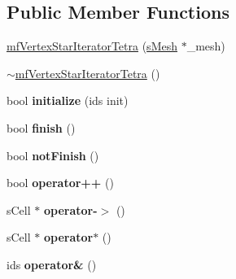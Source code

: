 \subsection*{Public Member Functions}
\begin{DoxyCompactItemize}
\item 
\hyperlink{classmf_1_1mfVertexStarIteratorTetra_a390fe108ee096669cb97b675463dc108}{mfVertexStarIteratorTetra} (\hyperlink{classmf_1_1mfIterator_aca31e4d7e7eca4e3b100530d8725064b}{sMesh} $\ast$\_\-mesh)
\item 
\hyperlink{classmf_1_1mfVertexStarIteratorTetra_aa1016d2262cde5e8fc20a884bd73b672}{$\sim$mfVertexStarIteratorTetra} ()
\item 
\hypertarget{classmf_1_1mfVertexStarIteratorTetra_a654c6ec5fb4b32cd5ae596d0f27e5e13}{
bool {\bfseries initialize} (ids init)}
\label{classmf_1_1mfVertexStarIteratorTetra_a654c6ec5fb4b32cd5ae596d0f27e5e13}

\item 
\hypertarget{classmf_1_1mfVertexStarIteratorTetra_a183585661d0ee1a496608d63d8730075}{
bool {\bfseries finish} ()}
\label{classmf_1_1mfVertexStarIteratorTetra_a183585661d0ee1a496608d63d8730075}

\item 
\hypertarget{classmf_1_1mfVertexStarIteratorTetra_a37f6714f32884ded48627013ef1fa5a4}{
bool {\bfseries notFinish} ()}
\label{classmf_1_1mfVertexStarIteratorTetra_a37f6714f32884ded48627013ef1fa5a4}

\item 
\hypertarget{classmf_1_1mfVertexStarIteratorTetra_a7311e492ac00f08eb959a159472a515e}{
bool {\bfseries operator++} ()}
\label{classmf_1_1mfVertexStarIteratorTetra_a7311e492ac00f08eb959a159472a515e}

\item 
\hypertarget{classmf_1_1mfVertexStarIteratorTetra_af2ec5900b861bd61d2da85d8220127c4}{
sCell $\ast$ {\bfseries operator-\/$>$} ()}
\label{classmf_1_1mfVertexStarIteratorTetra_af2ec5900b861bd61d2da85d8220127c4}

\item 
\hypertarget{classmf_1_1mfVertexStarIteratorTetra_a6a368ce6afd8a49c2122ea738549bf6f}{
sCell $\ast$ {\bfseries operator$\ast$} ()}
\label{classmf_1_1mfVertexStarIteratorTetra_a6a368ce6afd8a49c2122ea738549bf6f}

\item 
\hypertarget{classmf_1_1mfVertexStarIteratorTetra_a79fdbcba50018db3cd181999d71da61d}{
ids {\bfseries operator\&} ()}
\label{classmf_1_1mfVertexStarIteratorTetra_a79fdbcba50018db3cd181999d71da61d}

\end{DoxyCompactItemize}
